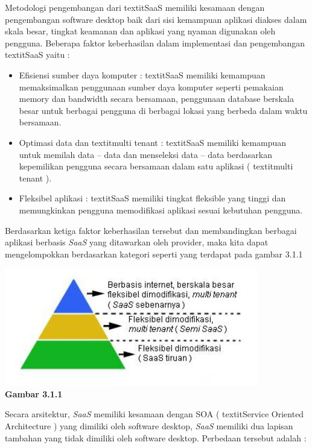 \tab Metodologi pengembangan dari textit{SaaS} memiliki kesamaan dengan pengembangan software desktop baik dari sisi kemampuan aplikasi diakses dalam skala besar, tingkat keamanan dan aplikasi yang nyaman digunakan oleh pengguna. Beberapa faktor keberhasilan dalam implementasi dan pengembangan textit{SaaS} yaitu :\\
\begin{itemize}
\item Efisiensi sumber daya komputer : textit{SaaS} memiliki kemampuan memaksimalkan penggunaan sumber daya komputer seperti pemakaian memory dan bandwidth secara bersamaan, penggunaan database berskala besar untuk berbagai pengguna di berbagai lokasi yang berbeda dalam waktu bersamaan.
\item Optimasi data dan textit{multi tenant} : textit{SaaS} memiliki kemampuan untuk memilah data – data dan menseleksi data – data berdasarkan kepemilikan pengguna secara bersamaan dalam satu aplikasi ( textit{multi tenant} ).
\item Fleksibel aplikasi : textit{SaaS} memiliki tingkat fleksible yang tinggi dan memungkinkan pengguna memodifikasi aplikasi sesuai kebutuhan pengguna.
\end{itemize}
Berdasarkan ketiga faktor keberhasilan tersebut dan membandingkan berbagai aplikasi berbasis \textit{SaaS} yang ditawarkan oleh provider, maka kita dapat mengelompokkan berdasarkan kategori seperti yang terdapat pada gambar 3.1.1\\
\begin{center}
\includegraphics[scale=1]{Gambar311.jpg} \\
\textbf{Gambar 3.1.1}
\end{center}
\tab Secara arsitektur, \textit{SaaS} memiliki kesamaan dengan SOA ( textit{Service Oriented Architecture} ) yang dimiliki oleh software desktop, \textit{SaaS} memiliki dua lapisan tambahan yang tidak dimiliki oleh software desktop. Perbedaan tersebut adalah :\\
